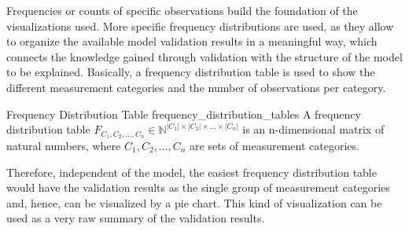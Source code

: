 Frequencies or counts of specific observations build the foundation of the visualizations used. More specific frequency distributions are used, as they allow to organize the available model validation results in a meaningful way, which connects the knowledge gained through validation with the structure of the model to be explained. Basically, a frequency distribution table is used to show the different measurement categories and the number of observations per category.

\begin{Def}{Frequency Distribution Table \cite{manikandan2011frequency}}{frequency_distribution_tables}
A frequency distribution table $F_{C_1,C_2,...,C_n} \in \mathbb{N}^{|C_1| \times |C_2| \times ... \times |C_n|}$ is an n-dimensional matrix of natural numbers, where $C_1, C_2, ... , C_n$ are sets of measurement categories. 
\end{Def}

Therefore, independent of the model, the easiest frequency distribution table would have the validation results as the single group of measurement categories and, hence, can be visualized by a pie chart. This kind of visualization can be used as a very raw summary of the validation results.

